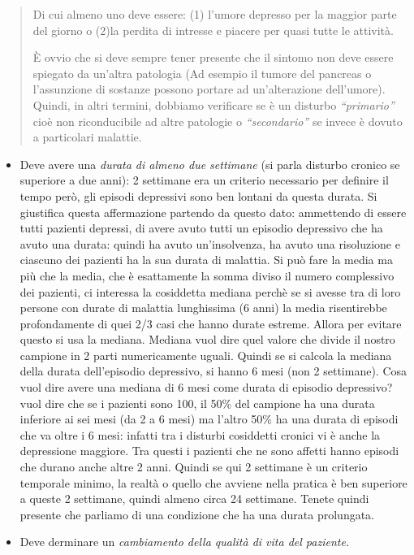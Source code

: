 \documentclass[]{article}
\begin{document}
\begin{quote}
Di cui almeno uno deve essere: (1) l'umore depresso per la maggior parte
del giorno o (2)la perdita di intresse e piacere per quasi tutte le
attività.

È ovvio che si deve sempre tener presente che il sintomo non deve essere
spiegato da un'altra patologia (Ad esempio il tumore del pancreas o
l'assunzione di sostanze possono portare ad un'alterazione dell'umore).
Quindi, in altri termini, dobbiamo verificare se è un disturbo
\emph{``primario''} cioè non riconducibile ad altre patologie o
\emph{``secondario''} se invece è dovuto a particolari malattie.
\end{quote}

\begin{itemize}
\item
  Deve avere una \emph{\emph{durata di almeno due settimane}} (si parla
  disturbo cronico se superiore a due anni): 2 settimane era un criterio
  necessario per definire il tempo però, gli episodi depressivi sono ben
  lontani da questa durata. Si giustifica questa affermazione partendo
  da questo dato: ammettendo di essere tutti pazienti depressi, di avere
  avuto tutti un episodio depressivo che ha avuto una durata: quindi ha
  avuto un'insolvenza, ha avuto una risoluzione e ciascuno dei pazienti
  ha la sua durata di malattia. Si può fare la media ma più che la
  media, che è esattamente la somma diviso il numero complessivo dei
  pazienti, ci interessa la cosiddetta mediana perchè se si avesse tra
  di loro persone con durate di malattia lunghissima (6 anni) la media
  risentirebbe profondamente di quei 2/3 casi che hanno durate estreme.
  Allora per evitare questo si usa la mediana. Mediana vuol dire quel
  valore che divide il nostro campione in 2 parti numericamente uguali.
  Quindi se si calcola la mediana della durata dell'episodio depressivo,
  si hanno 6 mesi (non 2 settimane). Cosa vuol dire avere una mediana di
  6 mesi come durata di episodio depressivo? vuol dire che se i pazienti
  sono 100, il 50\% del campione ha una durata inferiore ai sei mesi (da
  2 a 6 mesi) ma l'altro 50\% ha una durata di episodi che va oltre i 6
  mesi: infatti tra i disturbi cosiddetti cronici vi è anche la
  depressione maggiore. Tra questi i pazienti che ne sono affetti hanno
  episodi che durano anche altre 2 anni. Quindi se qui 2 settimane è un
  criterio temporale minimo, la realtà o quello che avviene nella
  pratica è ben superiore a queste 2 settimane, quindi almeno circa 24
  settimane. Tenete quindi presente che parliamo di una condizione che
  ha una durata prolungata.
\item
  Deve derminare un \emph{\emph{cambiamento della qualità di vita del
  paziente.}}
\end{itemize}
\end{document}
